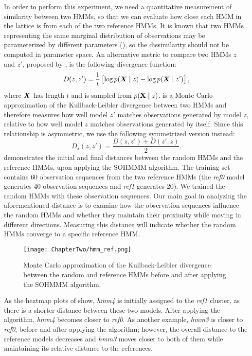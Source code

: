 In order to perform this experiment, we need a quantitative measurement of similarity between two HMMs, so that we can evaluate how close each HMM in the lattice is from each of the two reference HMMs. It is known that two HMMs representing the same marginal distribution of observations may be parameterized by different parameters (\citet{Rabiner1989}), so the dissimilarity should not be computed in parameter space. An alternative metric to compare two HMMs $z$ and $z'$, proposed by \citet{Juang1985}, is the following divergence function:
\begin{equation}
    D(z, z') = \frac{1}{t}\left[\log p({\bm{X}} \mid z) - \log p({\bm{X}} \mid z')\right],
    \label{eq:hmm_div}
\end{equation}
where ${\bm{X}}$ has length $t$ and is sampled from $p({\mathbf{X}} \mid z)$.  is a Monte Carlo approximation of the Kullback-Leibler divergence between two HMMs and therefore measures how well model $z'$ matches observations generated by model $z$, relative to how well model $z$ matches observations generated by itself. Since this relationship is asymmetric, we use the following symmetrized version instead:
\begin{equation}
    D_{s}(z,z') = \frac{D(z,z')+D(z',z)}{2}.
    \label{eq:hmm_div_sym}
\end{equation}
 demonstrates the initial and final distances between the random HMMs and the reference HMMs, upon applying the SOHMMM algorithm. The training set contains 60 observation sequences from the two reference HMMs (the \textit{ref0} model generates 40 observation sequences and \textit{ref1} generates 20). We trained the random HMMs with these observation sequences.
Our main goal in analyzing the aforementioned distance is to examine how the observation sequences influence the random HMMs and whether they maintain their proximity while moving in different directions. Measuring this distance will indicate whether the random HMMs converge to a specific reference HMM.

\begin{figure}[h]
    \centering
    \texttt{[image: ChapterTwo/hmm\_ref.png]}
    \caption{Monte Carlo approximation of the Kullback-Leibler divergence between the random and reference HMMs before and after applying the SOHMMM algorithm.}
    \label{fig:sohmmm_distances}
\end{figure}

As the heatmap plots of  show, \textit{hmm4} is initially assigned to the \textit{ref1} cluster, as there is a shorter distance between these two models. After applying the algorithm, \textit{hmm4} becomes closer to \textit{ref0}. As another example, \textit{hmm3} is closer to \textit{ref0}, before and after applying the algorithm; however, the overall distance to the reference models decreases and \textit{hmm3} moves closer to both of them while maintaining its relative distance to the references.

